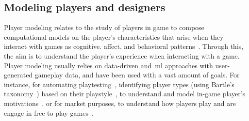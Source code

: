 


\subsection{Modeling players and designers}


Player modeling relates to the study of players in game to compose computational models on the player's characteristics that arise when they interact with games as cognitive. affect, and behavioral patterns~\cite{Yannakakis2013-playermodeling,thawonmas2019artificial}. Through this, the aim is to understand the player's experience when interacting with a game. Player modeling usually relies on data-driven and~\acrshort{ml} approaches with user-generated gameplay data, and have been used with a vast amount of goals. For instance, for automating playtesting~\cite{Holmgard2019-proceduralPersonas,Gudmundsson2018-HumanLikePlayCandyCrush}, identifying player types (using Bartle's taxonomy~\cite{bartle1996-taxonomy}) based on their playstyle~\cite{Drachen2009-playerModellingTombRaider}, to understand and model in-game player's motivations~\cite{Melhart2019-ModellingMotivation}, or for market purposes, to understand how players play and are engage in free-to-play games~\cite{Saas2016-DiscoveringPlayingPatterns,delRio2020-PlayerConversion,Guitart2019-PlayerBehavioralData}.


